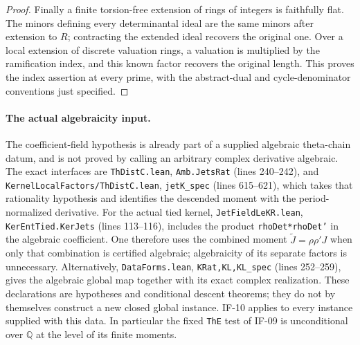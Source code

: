 \begin{proof}
Finally a finite torsion-free extension of rings of integers is
faithfully flat. The minors defining every determinantal ideal are
the same minors after extension to $R$; contracting the extended ideal
recovers the original one. Over a local extension of discrete valuation
rings, a valuation is multiplied by the ramification index, and this
known factor recovers the original length. This proves the index
assertion at every prime, with the abstract-dual and cycle-denominator
conventions just specified.
\end{proof}

\paragraph{The actual algebraicity input.}
The coefficient-field hypothesis is already part of a supplied
algebraic theta-chain datum, and is not proved by calling an arbitrary
complex derivative algebraic. The exact interfaces are
\texttt{ThDistC.lean}, \texttt{Amb.JetsRat} (lines 240--242), and
\texttt{KernelLocalFactors/ThDistC.lean}, \texttt{jetK\_spec}
(lines 615--621), which takes that rationality hypothesis and identifies
the descended moment with the period-normalized derivative.
For the actual tied kernel, \texttt{JetFieldLeKR.lean},
\texttt{KerEntTied.KerJets} (lines 113--116), includes the product
\texttt{rhoDet*rhoDet'} in the algebraic coefficient. One therefore
uses the combined moment $\widetilde J=\rho\rho'J$ when only that
combination is certified algebraic; algebraicity of its separate
factors is unnecessary. Alternatively,
\texttt{DataForms.lean}, \texttt{KRat,KL,KL\_spec} (lines 252--259),
gives the algebraic global map together with its exact complex
realization. These declarations are hypotheses and conditional descent
theorems; they do not by themselves construct a new closed global
instance. IF-10 applies to every instance supplied with this data. In
particular the fixed \texttt{ThE} test of IF-09 is unconditional over
$\mathbb Q$ at the level of its finite moments.

